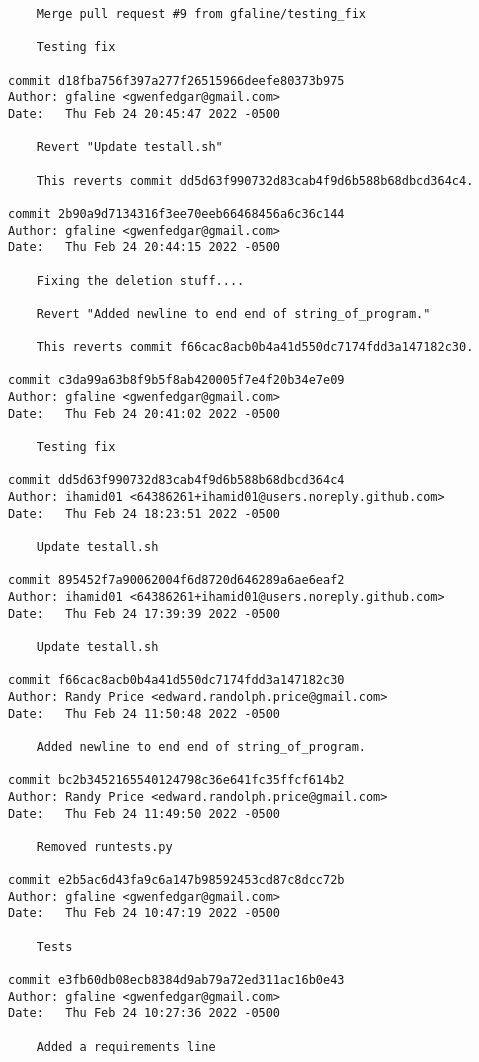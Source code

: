 {\begin{verbatim}
    Merge pull request #9 from gfaline/testing_fix
    
    Testing fix

commit d18fba756f397a277f26515966deefe80373b975
Author: gfaline <gwenfedgar@gmail.com>
Date:   Thu Feb 24 20:45:47 2022 -0500

    Revert "Update testall.sh"
    
    This reverts commit dd5d63f990732d83cab4f9d6b588b68dbcd364c4.

commit 2b90a9d7134316f3ee70eeb66468456a6c36c144
Author: gfaline <gwenfedgar@gmail.com>
Date:   Thu Feb 24 20:44:15 2022 -0500

    Fixing the deletion stuff....
    
    Revert "Added newline to end end of string_of_program."
    
    This reverts commit f66cac8acb0b4a41d550dc7174fdd3a147182c30.

commit c3da99a63b8f9b5f8ab420005f7e4f20b34e7e09
Author: gfaline <gwenfedgar@gmail.com>
Date:   Thu Feb 24 20:41:02 2022 -0500

    Testing fix

commit dd5d63f990732d83cab4f9d6b588b68dbcd364c4
Author: ihamid01 <64386261+ihamid01@users.noreply.github.com>
Date:   Thu Feb 24 18:23:51 2022 -0500

    Update testall.sh

commit 895452f7a90062004f6d8720d646289a6ae6eaf2
Author: ihamid01 <64386261+ihamid01@users.noreply.github.com>
Date:   Thu Feb 24 17:39:39 2022 -0500

    Update testall.sh

commit f66cac8acb0b4a41d550dc7174fdd3a147182c30
Author: Randy Price <edward.randolph.price@gmail.com>
Date:   Thu Feb 24 11:50:48 2022 -0500

    Added newline to end end of string_of_program.

commit bc2b3452165540124798c36e641fc35ffcf614b2
Author: Randy Price <edward.randolph.price@gmail.com>
Date:   Thu Feb 24 11:49:50 2022 -0500

    Removed runtests.py

commit e2b5ac6d43fa9c6a147b98592453cd87c8dcc72b
Author: gfaline <gwenfedgar@gmail.com>
Date:   Thu Feb 24 10:47:19 2022 -0500

    Tests

commit e3fb60db08ecb8384d9ab79a72ed311ac16b0e43
Author: gfaline <gwenfedgar@gmail.com>
Date:   Thu Feb 24 10:27:36 2022 -0500

    Added a requirements line


\end{verbatim}}
